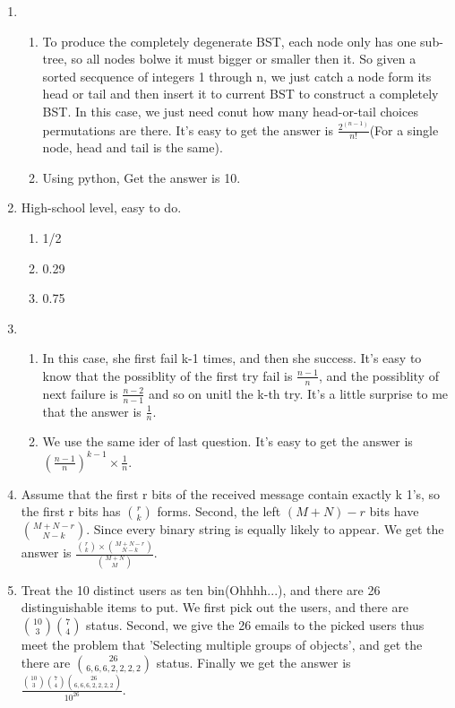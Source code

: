 \documentclass{article}
\begin{document}
\begin{enumerate}
	\item
	\begin{enumerate}
	\item To produce the completely degenerate BST, each node only has one sub-tree, so all nodes bolwe it must bigger or smaller then it. So given a sorted secquence of integers 1 through n, we just catch a node form its head or tail and then insert it to current BST to construct a completely BST. In this case, we just need conut how many head-or-tail choices permutations are there. It's easy to get the answer is $\frac{2^{(n-1)}}{n!}$(For a single node, head and tail is the same).
	\item Using python, Get the answer is 10.
	
	\end{enumerate}
	
	\item High-school level, easy to do.
	\begin{enumerate}
	\item 1/2
	\item 0.29
	\item 0.75
	\end{enumerate}
	\item 
	\begin{enumerate}
	\item In this case, she first fail k-1 times, and then she success. It's easy to know that the possiblity of the first try fail is $\frac{n-1}{n}$, and the possiblity of next failure is $\frac{n-2}{n-1}$ and so on unitl the k-th try. It's a little surprise to me that the answer is $\frac{1}{n}$.
	\item We use the same ider of last question. It's easy to get the answer is $(\frac{n-1}{n})^{k-1}\times \frac{1}{n}$.
	\end{enumerate}
	\item 
	 Assume that the first r bits of the received message contain exactly k 1’s, so the first r bits has ${r \choose k}$ forms. Second, the left $(M+N)-r$ bits have ${M+N-r \choose N-k}$. Since every binary string is equally likely to appear. We get the answer is $\frac{{r \choose k}\times{M+N-r \choose N-k}}{{M+N \choose M}}$.
	\item 
	Treat the 10 distinct users as ten bin(Ohhhh...), and there are 26 distinguishable items to put. We first pick out the users, and there are ${10 \choose 3}{7 \choose 4}$ status. Second, we give the 26 emails to the picked users thus meet the problem that 'Selecting multiple groups of objects', and get the there are ${26 \choose 6,6,6,2,2,2,2}$ status. Finally we get the answer is $\frac{{10 \choose 3}{7 \choose 4}{26 \choose 6,6,6,2,2,2,2}}{10^{26}}$.

\end{enumerate}
\end{document}
